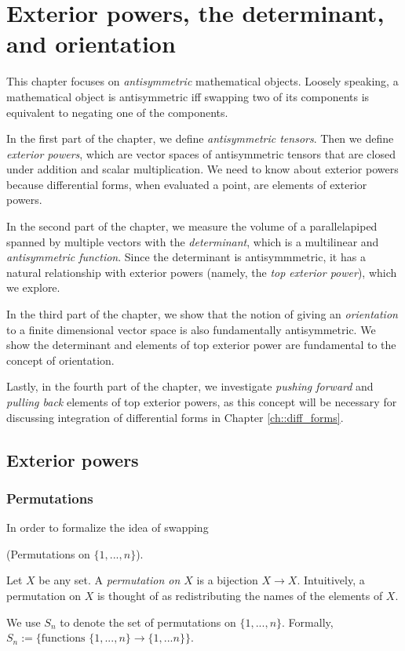 \chapter{Exterior powers, the determinant, and orientation}
\label{ch::exterior_pwrs}

This chapter focuses on \textit{antisymmetric} mathematical objects. Loosely speaking, a mathematical object is antisymmetric iff swapping two of its components is equivalent to negating one of the components.

In the first part of the chapter, we define \textit{antisymmetric tensors}. Then we define \textit{exterior powers}, which are vector spaces of antisymmetric tensors that are closed under addition and scalar multiplication. We need to know about exterior powers because differential forms, when evaluated a point, are elements of exterior powers.

In the second part of the chapter, we measure the volume of a parallelapiped spanned by multiple vectors with the \textit{determinant}, which is a multilinear and \textit{antisymmetric function}. Since the determinant is antisymmmetric, it has a natural relationship with exterior powers (namely, the \textit{top exterior power}), which we explore.

In the third part of the chapter, we show that the notion of giving an \textit{orientation} to a finite dimensional vector space is also fundamentally antisymmetric. We show the determinant and elements of top exterior power are fundamental to the concept of orientation.

Lastly, in the fourth part of the chapter, we investigate \textit{pushing forward} and \textit{pulling back} elements of top exterior powers, as this concept will be necessary for discussing integration of differential forms in Chapter \ref{ch::diff_forms}.

\section{Exterior powers}

\subsection*{Permutations}

In order to formalize the idea of swapping

\begin{defn}
    (Permutations on $\{1, ..., n\}$).
    
    Let $X$ be any set. A \textit{permutation on $X$} is a bijection $X \rightarrow X$. Intuitively, a permutation on $X$ is thought of as redistributing the names of the elements of $X$.
    
    We use $S_n$ to denote the set of permutations on $\{1, ..., n\}$. Formally, $S_n := \{ \text{functions } \text{$\{1, ..., n\} \rightarrow \{1, ... n \}$} \}$.
\end{defn}

